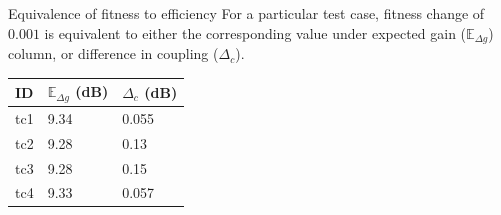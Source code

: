 \documentclass{beamer}
\begin{document}
\begin{frame}{Equivalence of fitness to efficiency}
    \small For a particular test case, fitness change of $0.001$ is equivalent to either the corresponding value under expected gain ($\mathbb E_{\Delta g}$) column, or difference in coupling ($\Delta_c$).
    \begin{table}
        \centering
        \begin{threeparttable}
            \begin{tabular}{|C{1cm}|C{2.5cm}|C{2.5cm}|} \hline
                ID& $\mathbb E_{\Delta g}$ (dB) & $\Delta_{c}$ (dB) \\ \hline
                tc1 & 9.34 & 0.055 \\ \hline
                tc2 & 9.28 & 0.13 \\ \hline
                tc3 & 9.28 & 0.15 \\ \hline
                tc4 & 9.33 & 0.057 \\
                \hline\end{tabular}
        \end{threeparttable}
    \end{table}
\end{frame}
\end{document}
